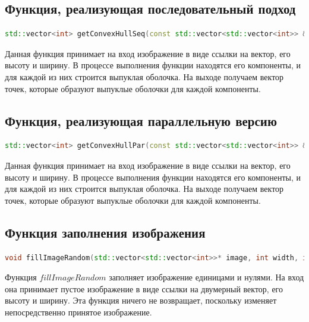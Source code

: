 \documentclass[a4paper, 12pt]{extarticle}
\begin{document}
	\subsection{Функция, реализующая последовательный подход}
	\begin{lstlisting}[language=C++]
		std::vector<int> getConvexHullSeq(const std::vector<std::vector<int>> &image, int width, int height);
	\end{lstlisting}
	Данная функция принимает на вход изображение в виде ссылки на вектор, его высоту и ширину. В процессе выполнения функции находятся его компоненты, и для каждой из них строится выпуклая оболочка. На выходе получаем вектор точек, которые образуют выпуклые оболочки для каждой компоненты.
	
	\subsection{Функция, реализующая параллельную версию}
	\begin{lstlisting}[language=C++]
		std::vector<int> getConvexHullPar(const std::vector<std::vector<int>> &image, int width, int height);
	\end{lstlisting}
	Данная функция принимает на вход изображение в виде ссылки на вектор, его высоту и ширину. В процессе выполнения функции находятся его компоненты, и для каждой из них строится выпуклая оболочка. На выходе получаем вектор точек, которые образуют выпуклые оболочки для каждой компоненты.
	
	\subsection{Функция заполнения изображения}
	\begin{lstlisting}[language=C++]
	void fillImageRandom(std::vector<std::vector<int>>* image, int width, int height);
	\end{lstlisting}
	Функция $fillImageRandom$ заполняет изображение единицами и нулями. На вход она принимает пустое изображение в виде ссылки на двумерный вектор, его высоту и ширину. Эта функция ничего не возвращает, поскольку изменяет непосредственно принятое изображение.
	\newpage
\end{document}
